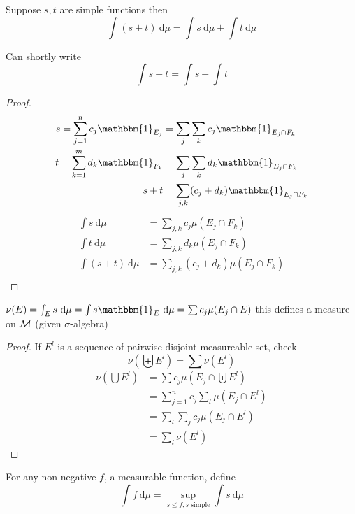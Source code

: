 \begin{lemma}
  Suppose $s, t$ are simple functions then
  \[\int (s + t)\ \mathrm{d}\mu = \int s \ \mathrm{d}\mu+ \int t\ \mathrm{d}\mu\] 
\end{lemma}

\begin{remark}
  Can shortly write 
  \[\int s + t = \int s + \int t\]
\end{remark}

\begin{proof}
  \begin{align*}
  s = \sum_{j=1}^n c_j \mathbbm{1}_{E_j} &= \sum_{j}\sum_k c_j \mathbbm{1}_{E_{j} \cap F_k} \\
  t = \sum_{k=1}^m d_k \mathbbm{1}_{F_k} &= \sum_{j}\sum_k d_k \mathbbm{1}_{E_{j} \cap F_k} \\
  s + t&= \sum_{j, k} (c_j + d_k) \mathbbm{1}_{E_j \cap F_k} \\
  \end{align*} 
  \begin{align*}
    \int s\ \mathrm{d}\mu &= \sum_{j, k}c_j \mu(E_j \cap F_k) \\
    \int t\ \mathrm{d}\mu &= \sum_{j, k}d_k \mu(E_j \cap F_k) \\
    \int (s + t)\ \mathrm{d}\mu &= \sum_{j, k}(c_j + d_k) \mu(E_j \cap F_k) \\
  \end{align*}
\end{proof}

\begin{lemma}\label{lem:measure-from-set}
  $\nu(E) = \int_E s \ \mathrm{d}\mu = \int s \mathbbm{1}_E\ \mathrm{d}\mu = \sum c_j \mu(E_j \cap E)$
  this defines a measure on $\mathcal M$ (given $\sigma$-algebra)
\end{lemma}

\begin{proof}
  If $E^l$ is a sequence of pairwise disjoint measureable set, check
  \[\nu\left(\biguplus E^l\right) = \sum \nu(E^l)\] 
  \begin{align*}
    \nu\left(\biguplus E^l\right) &= \sum c_j \mu(E_j \cap \biguplus E^l) \\
    &= \sum_{j=1}^n c_j \sum_l \mu(E_j \cap E^l) \\
    &= \sum_l \sum_j c_j \mu(E_j \cap E^l) \\
    &= \sum_l \nu(E^l)
  \end{align*}
\end{proof}

\begin{definition}
  For any non-negative $f$, a measurable function, define
  \[\int f \ \mathrm{d}\mu = \sup_{s \le f, s \text{ simple}} \int s \ \mathrm{d}\mu\]
\end{definition}

